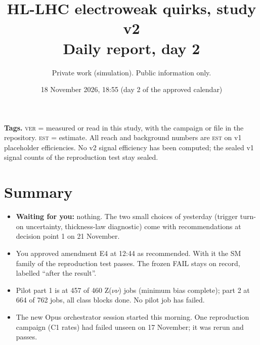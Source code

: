 \documentclass[11pt,a4paper]{article}
\title{HL-LHC electroweak quirks, study v2\\[2pt]\large Daily report, day 2}
\author{Private work (simulation). Public information only.}
\date{18 November 2026, 18:55 (day 2 of the approved calendar)}
\newcommand{\est}{\textsc{est}}
\newcommand{\ver}{\textsc{ver}}
\begin{document}
\maketitle

\noindent\textbf{Tags.} \ver{} = measured or read in this study, with the campaign or file in the repository.
\est{} = estimate. All reach and background numbers are \est{} on v1 placeholder efficiencies. No v2 signal
efficiency has been computed; the sealed v1 signal counts of the reproduction test stay sealed.

\section{Summary}
\begin{itemize}
\item \textbf{Waiting for you:} nothing. The two small choices of yesterday (trigger turn-on uncertainty,
      thickness-law diagnostic) come with recommendations at decision point 1 on 21 November.
\item You approved amendment E4 at 12:44 as recommended. With it the SM family of the reproduction test passes.
      The frozen FAIL stays on record, labelled ``after the result''.
\item Pilot part 1 is at 457 of 460 Z($\nu\nu$) jobs (minimum bias complete); part 2 at 664 of 762 jobs, all
      class blocks done. No pilot job has failed.
\item The new Opus orchestrator session started this morning. One reproduction campaign (C1 rates) had failed
      unseen on 17 November; it was rerun and passes.
\end{itemize}
\end{document}
